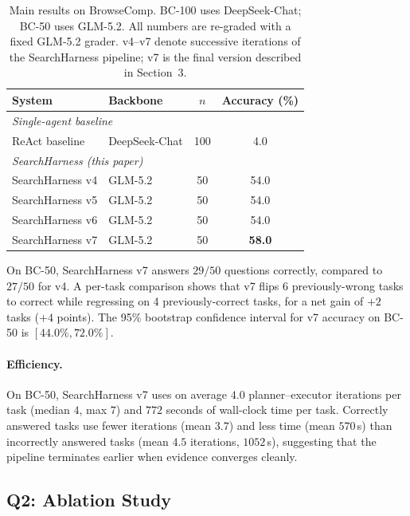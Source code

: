 \begin{table}[t]
  \centering
  \small
  \begin{tabular}{llcc}
    \toprule
    System & Backbone & $n$ & Accuracy (\%) \\
    \midrule
    \multicolumn{4}{l}{\emph{Single-agent baseline}} \\
    \quad ReAct baseline & DeepSeek-Chat & 100 & 4.0 \\
    \midrule
    \multicolumn{4}{l}{\emph{SearchHarness (this paper)}} \\
    \quad SearchHarness v4 & GLM-5.2 & 50 & 54.0 \\
    \quad SearchHarness v5 & GLM-5.2 & 50 & 54.0 \\
    \quad SearchHarness v6 & GLM-5.2 & 50 & 54.0 \\
    \quad SearchHarness v7 & GLM-5.2 & 50 & \textbf{58.0} \\
    \bottomrule
  \end{tabular}
  \caption{Main results on BrowseComp. BC-100 uses DeepSeek-Chat; BC-50 uses GLM-5.2. All numbers are re-graded with a fixed GLM-5.2 grader. v4--v7 denote successive iterations of the SearchHarness pipeline; v7 is the final version described in Section~3.}
  \label{tab:exp:main}
\end{table}

On BC-50, SearchHarness v7 answers $29/50$ questions correctly, compared to $27/50$ for v4.
A per-task comparison shows that v7 flips 6 previously-wrong tasks to correct while regressing on 4 previously-correct tasks, for a net gain of $+2$ tasks ($+4$ points).
The 95\% bootstrap confidence interval for v7 accuracy on BC-50 is $[44.0\%, 72.0\%]$.

\paragraph{Efficiency.}
On BC-50, SearchHarness v7 uses on average $4.0$ planner--executor iterations per task (median $4$, max $7$) and $772$ seconds of wall-clock time per task.
Correctly answered tasks use fewer iterations (mean $3.7$) and less time (mean $570$\,s) than incorrectly answered tasks (mean $4.5$ iterations, $1052$\,s), suggesting that the pipeline terminates earlier when evidence converges cleanly.

\subsection{Q2: Ablation Study}
\label{sec:exp:ablation}

